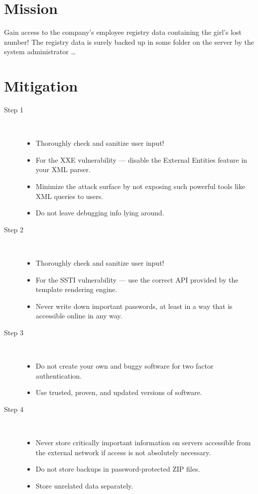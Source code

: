 \documentclass[11pt, a4paper]{article}
\begin{document}
\section{Mission}

Gain access to the company's employee registry data containing the
girl's lost number! The registry data is surely backed up in some folder on the server by the system administrator \ldots

\section{Mitigation}

\begin{description}
  \item[Step 1]~
  \begin{itemize}
	\item Thoroughly check and sanitize user input!
	\item For the XXE vulnerability --- disable the External Entities feature in your XML parser.
	\item Minimize the attack surface by not exposing such powerful tools like XML queries
        to users.
	\item Do not leave debugging info lying around.
  \end{itemize}

  \item[Step 2]~
	\begin{itemize}
	\item Thoroughly check and sanitize user input!
	\item For the SSTI vulnerability --- use the correct API provided by the template rendering engine.
    \item Never write down important passwords,
        at least in a way that is accessible online in any way.
	\end{itemize}

  \item[Step 3]~
  \begin{itemize}
  	\item Do not create your own and buggy software for two factor authentication.
  	\item Use trusted, proven, and updated versions of software.
  \end{itemize}

  \item[Step 4]~
	\begin{itemize}
	\item Never store critically important information on servers accessible from the
        external network if access is not absolutely necessary.
     \item Do not store backups in password-protected ZIP files.
     \item Store unrelated data separately.
     \end{itemize}
\end{description}
\end{document}
